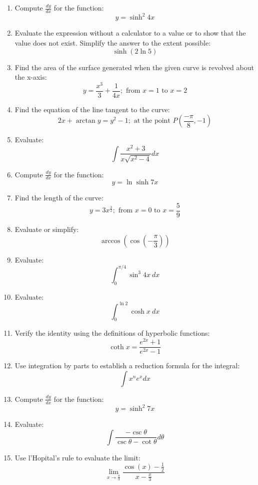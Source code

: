 \documentclass[fleqn]{article}
\begin{document}
\begin{multicols}{2}
\begin{enumerate}

\item Compute \(\frac{dy}{dx}\) for the function:
\[y=\sinh^2 4x\]

\item Evaluate the expression without a calculator to a value or to show that the value does not exist. Simplify the answer to the extent possible:
\[\sinh(2\ln 5)\]

\item Find the area of the surface generated when the given curve is revolved about the x-axis:
\[y=\frac{x^3}{3}+\frac{1}{4x};\text{ from }x=1\text{ to }x=2\]

\item Find the equation of the line tangent to the curve:
\[2x+\arctan y=y^2-1;\text{ at the point }P(\frac{-\pi}{8},-1)\]

\item Evaluate:
\[\int\frac{x^2+3}{x\sqrt{x^2-4}}dx\]

\item Compute \(\frac{dy}{dx}\) for the function:
\[y=\ln\sinh 7x\]

\item Find the length of the curve:
\[y=3x^{\frac{3}{2}};\text{ from }x=0\text{ to }x=\frac{5}{9}\]

\item Evaluate or simplify:
\[\arccos\left(\cos\left(-\frac{\pi}{3}\right)\right)\]

\item Evaluate:
\[\int_0^{\pi/4}\sin^3 4x\ dx\]

\item Evaluate:
\[\int_0^{\ln 2}\cosh x\ dx\]

\item Verify the identity using the definitions of hyperbolic functions:
\[\coth x=\frac{e^{2x}+1}{e^{2x}-1}\]

\item Use integration by parts to establish a reduction formula for the integral:
\[\int x^n e^x dx\]

\item Compute \(\frac{dy}{dx}\) for the function:
\[y=\sinh^2 7x\]

\item Evaluate:
\[\int\frac{-\csc\theta}{\csc\theta-\cot\theta}d\theta\]

\item Use l'Hopital's rule to evaluate the limit:
\[\lim_{x\to\frac{\pi}{3}}\frac{\cos(x)-\frac{1}{2}}{x-\frac{x}{3}}\]


\end{enumerate}
\end{multicols}
\end{document}
